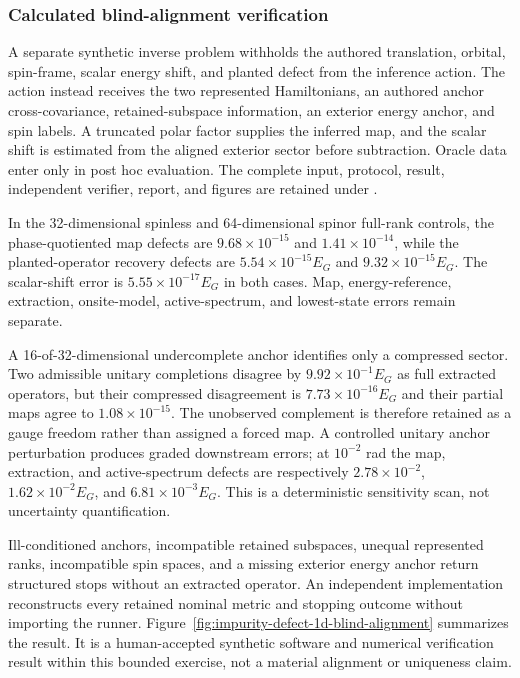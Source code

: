 \subsubsection{Calculated blind-alignment verification}

A separate synthetic inverse problem withholds the authored translation,
orbital, spin-frame, scalar energy shift, and planted defect from the inference
action. The action instead receives the two represented Hamiltonians, an
authored anchor cross-covariance, retained-subspace information, an exterior
energy anchor, and spin labels. A truncated polar factor supplies the inferred
map, and the scalar shift is estimated from the aligned exterior sector before
subtraction. Oracle data enter only in post hoc evaluation. The complete input,
protocol, result, independent verifier, report, and figures are retained under
.

In the 32-dimensional spinless and 64-dimensional spinor full-rank controls,
the phase-quotiented map defects are $9.68\times10^{-15}$ and
$1.41\times10^{-14}$, while the planted-operator recovery defects are
$5.54\times10^{-15}E_G$ and $9.32\times10^{-15}E_G$. The scalar-shift error is
$5.55\times10^{-17}E_G$ in both cases. Map, energy-reference, extraction,
onsite-model, active-spectrum, and lowest-state errors remain separate.

A 16-of-32-dimensional undercomplete anchor identifies only a compressed
sector. Two admissible unitary completions disagree by $9.92\times10^{-1}E_G$
as full extracted operators, but their compressed disagreement is
$7.73\times10^{-16}E_G$ and their partial maps agree to
$1.08\times10^{-15}$. The unobserved complement is therefore retained as a
gauge freedom rather than assigned a forced map. A controlled unitary anchor
perturbation produces graded downstream errors; at $10^{-2}$ rad the map,
extraction, and active-spectrum defects are respectively $2.78\times10^{-2}$,
$1.62\times10^{-2}E_G$, and $6.81\times10^{-3}E_G$. This is a deterministic
sensitivity scan, not uncertainty quantification.

Ill-conditioned anchors, incompatible retained subspaces, unequal represented
ranks, incompatible spin spaces, and a missing exterior energy anchor return
structured stops without an extracted operator. An independent implementation
reconstructs every retained nominal metric and stopping outcome without
importing the runner. Figure~\ref{fig:impurity-defect-1d-blind-alignment}
summarizes the result. It is a human-accepted synthetic software and numerical
verification result within this bounded exercise, not a material alignment or
uniqueness claim.

